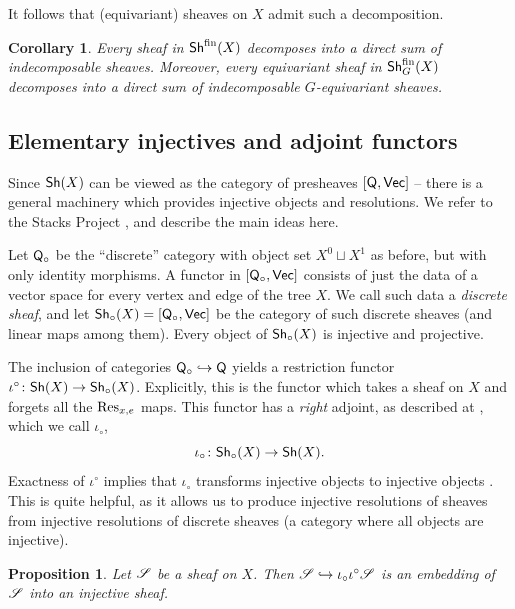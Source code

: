 \documentclass[letter]{amsart}
\newtheorem{corollary}[thm]{Corollary}
\newtheorem{proposition}[thm]{Proposition}
\theoremstyle{definition}
\theoremstyle{remark}
\numberwithin{thm}{section}
\numberwithin{equation}{section}
\begin{document}
It follows that (equivariant) sheaves on $X$ admit such a decomposition.
\begin{corollary}
Every sheaf in ${\mathsf{Sh}}^{\operatorname{fin}}(X)$ decomposes into a direct sum of indecomposable sheaves.  Moreover, every equivariant sheaf in ${\mathsf{Sh}}_G^{\operatorname{fin}}(X)$ decomposes into a direct sum of indecomposable $G$-equivariant sheaves.
\end{corollary}

\subsection{Elementary injectives and adjoint functors}

Since ${\mathsf{Sh}}(X)$ can be viewed as the category of presheaves $[{\mathsf{Q}}, {\mathsf{Vec}}]$ -- there is a general machinery which provides injective objects and resolutions.  We refer to the Stacks Project \cite[\href{https://stacks.math.columbia.edu/tag/01DJ}{Tag 01DJ}]{stacks-project}, and describe the main ideas here.  

Let ${\mathsf{Q}}_\circ$ be the ``discrete'' category with object set $X^0 \sqcup X^1$ as before, but with only identity morphisms.  A functor in $[{\mathsf{Q}}_\circ, {\mathsf{Vec}}]$ consists of just the data of a vector space for every vertex and edge of the tree $X$.  We call such data a {\em discrete sheaf}, and let ${\mathsf{Sh}}_\circ(X) = [{\mathsf{Q}}_\circ, {\mathsf{Vec}}]$ be the category of such discrete sheaves (and linear maps among them).  Every object of ${\mathsf{Sh}}_\circ(X)$ is injective and projective.   

The inclusion of categories ${\mathsf{Q}}_\circ \hookrightarrow {\mathsf{Q}}$ yields a restriction functor $\iota^\circ \colon {\mathsf{Sh}}(X) \rightarrow {\mathsf{Sh}}_\circ(X)$.  Explicitly, this is the functor which takes a sheaf on $X$ and forgets all the $\operatorname{Res}_{x,e}$ maps.  This functor has a {\em right} adjoint, as described at \cite[\href{https://stacks.math.columbia.edu/tag/00XF}{Tag 00XF}]{stacks-project}, which we call $\iota_\circ$,
$$\iota_\circ \colon {\mathsf{Sh}}_\circ(X) \rightarrow {\mathsf{Sh}}(X).$$
Exactness of $\iota^\circ$ implies that $\iota_\circ$ transforms injective objects to injective objects \cite[\href{https://stacks.math.columbia.edu/tag/015Z}{Tag 015Z}]{stacks-project}.  This is quite helpful, as it allows us to produce injective resolutions of sheaves from injective resolutions of discrete sheaves (a category where all objects are injective).
\begin{proposition}
Let ${\mathscr{S}}$ be a sheaf on $X$.  Then ${\mathscr{S}} \hookrightarrow \iota_\circ \iota^\circ {\mathscr{S}}$ is an embedding of ${\mathscr{S}}$ into an injective sheaf.\end{proposition}
\end{document}
